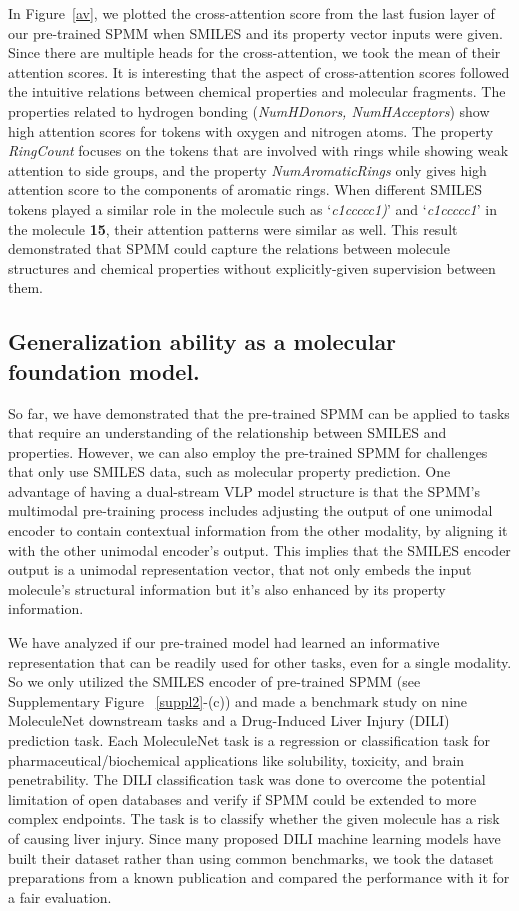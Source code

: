 \documentclass{nature_meth}
\newcommand{\1}{\blmath{1}}
\newcommand{\0}{\blmath{0}}
\begin{document}
In Figure~\ref{av}, we plotted the cross-attention score from the last fusion layer of our pre-trained SPMM when SMILES and its property vector inputs were given. Since there are multiple heads for the cross-attention, we took the mean of their attention scores. It is interesting that the aspect of cross-attention scores followed the intuitive relations between chemical properties and molecular fragments.
The properties related to hydrogen bonding (\emph{NumHDonors, NumHAcceptors}) show high attention scores for tokens with oxygen and nitrogen atoms. 
The property \emph{RingCount} focuses on the tokens that are involved with rings while showing weak attention to side groups, and the property \emph{NumAromaticRings} only gives high attention score to the components of aromatic rings. 
When different SMILES tokens played a similar role in the molecule such as `\emph{c1ccccc1)}' and `\emph{c1ccccc1}' in the molecule \textbf{15}, their attention patterns were similar as well. This result demonstrated that SPMM could capture the relations between molecule structures and chemical properties without explicitly-given supervision between them.


\subsection{Generalization ability as a molecular foundation model.}
So far, we have demonstrated that the pre-trained SPMM can be applied to tasks that require an understanding of the relationship between SMILES and properties. However, we can also employ the pre-trained SPMM for challenges that only use SMILES data, such as molecular property prediction. One advantage of having a dual-stream VLP model structure is that the SPMM's multimodal pre-training process includes adjusting the output of one unimodal encoder to contain contextual information from the other modality, by aligning it with the other unimodal encoder's output. This implies that the SMILES encoder output is a unimodal representation vector, that not only embeds the input molecule's structural information but it's also enhanced by its property information. 

We have analyzed if our pre-trained model had learned an informative representation that can be readily used for other tasks, even for a single modality. So we only utilized the SMILES encoder of pre-trained SPMM (see Supplementary Figure ~\ref{suppl2}-(c)) and made a benchmark study on nine MoleculeNet\cite{moleculenet} downstream tasks and a Drug-Induced Liver Injury (DILI) prediction task. Each MoleculeNet task is a regression or classification task for pharmaceutical/biochemical applications like solubility, toxicity, and brain penetrability. 
The DILI classification task was done to overcome the potential limitation of open databases\cite{nonadditivity1, nonadditivity2} and verify if SPMM could be extended to more complex endpoints. The task is to classify whether the given molecule has a risk of causing liver injury. Since many proposed DILI machine learning models have built their dataset rather than using common benchmarks, we took the dataset preparations from a known publication\cite{dili2018} and compared the performance with it for a fair evaluation.
\end{document}
